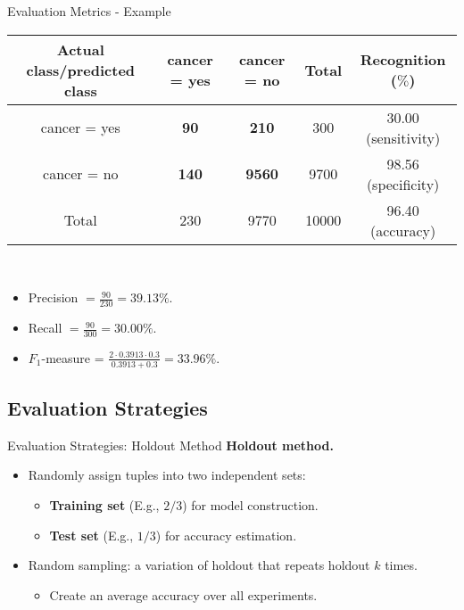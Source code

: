 \begin{frame}{Evaluation Metrics - Example}
	\centering
	\begin{tabular}{|c|c|c|c|c|}
		\hline
		Actual class/predicted class & cancer = yes & cancer = no   & Total & Recognition ($\%$)  \\\hline
		cancer = yes                 & \textbf{90}  & \textbf{210}  & 300   & 30.00 (sensitivity) \\\hline
		cancer = no                  & \textbf{140} & \textbf{9560} & 9700  & 98.56 (specificity) \\\hline
		Total                        & 230          & 9770          & 10000 & 96.40 (accuracy)    \\\hline
	\end{tabular}\\[0.2cm]
	\begin{itemize}
		\item Precision $= \frac{90}{230} = 39.13 \%$.
		\item Recall $=\frac{90}{300} = 30.00 \%$.
		\item $F_1$-measure = $\frac{2 \cdot 0.3913 \cdot 0.3}{0.3913 + 0.3} = 33.96 \%$.
	\end{itemize}
\end{frame}

\subsection{Evaluation Strategies}


\begin{frame}{Evaluation Strategies: Holdout Method}
	\textbf{Holdout method.}
	\begin{itemize}
		\item Randomly assign tuples into two independent sets:
		      \begin{itemize}
			      \item \textbf{\color{airforceblue}Training set} (E.g., $2/3$) for model construction.
			      \item \textbf{\color{airforceblue}Test set} (E.g., $1/3$) for accuracy estimation.
		      \end{itemize}
		\item Random sampling: a variation of holdout that repeats holdout $k$ times.
		      \begin{itemize}
			      \item Create an average accuracy over all experiments.
		      \end{itemize}
	\end{itemize}

\end{frame}

